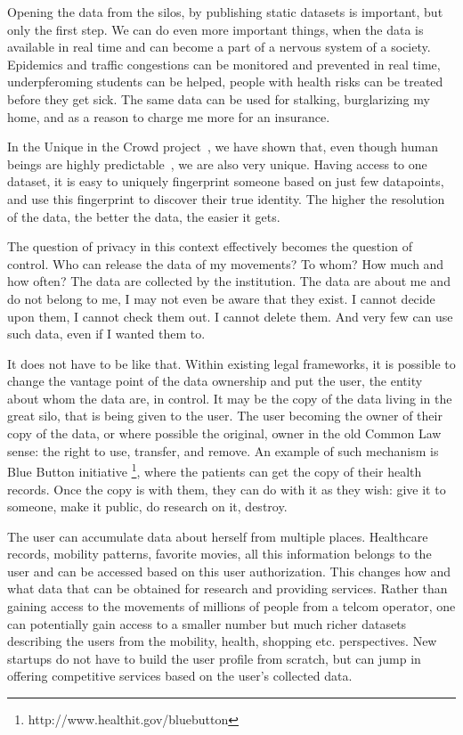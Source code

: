 Opening the data from the silos, by publishing static datasets is important, but only the first step. We can do even more important things, when the data is available in real time and can become a part of a nervous system of a society.
Epidemics and traffic congestions can be monitored and prevented in real time, underpferoming students can be helped, people with health risks can be treated before they get sick.  
The same data can be used for stalking, burglarizing my home, and as a reason to charge me more for an insurance.

In the Unique in the Crowd project~\cite{de2013unique}, we have shown that, even though human beings are highly predictable~\cite{song2010limits}, we are also very unique.
Having access to one dataset, it is easy to uniquely fingerprint someone based on just few datapoints, and use this fingerprint to discover their true identity. The higher the resolution of the data, the better the data, the easier it gets.

The question of privacy in this context effectively becomes the question of control. 
Who can release the data of my movements?
To whom? How much and how often?
The data are collected by the institution.
The data are about me and do not belong to me, I may not even be aware that they exist.
I cannot decide upon them, I cannot check them out.
I cannot delete them.
And very few can use such data, even if I wanted them to.

It does not have to be like that.
Within existing legal frameworks, it is possible to change the vantage point of the data ownership and put the user, the entity about whom the data are, in control.
It may be the copy of the data living in the great silo, that is being given to the user.
The user becoming the owner of their copy of the data, or where possible the original, owner in the old Common Law sense: the right to use, transfer, and remove. 
An example of such mechanism is Blue Button initiative \footnote{http://www.healthit.gov/bluebutton}, where the patients can get the copy of their health records.
Once the copy is with them, they can do with it as they wish: give it to someone, make it public, do research on it, destroy.

The user can accumulate data about herself from multiple places. 
Healthcare records, mobility patterns, favorite movies, all this information belongs to the user and can be accessed based on this user authorization.
This changes how and what data that can be obtained for research and providing services.
Rather than gaining access to the movements of millions of people from a telcom operator, one can potentially gain access to a smaller number but much richer datasets describing the users from the mobility, health, shopping etc. perspectives.
New startups do not have to build the user profile from scratch, but can jump in offering competitive services based on the user's collected data. 

